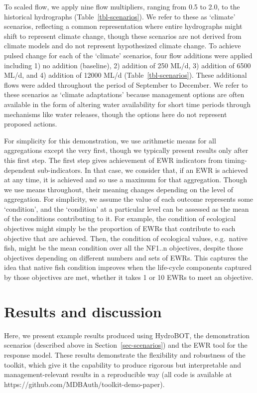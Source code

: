 \documentclass[
  number]{elsarticle}
\begin{document}
To scaled flow, we apply nine flow multipliers, ranging from 0.5 to 2.0,
to the historical hydrographs (Table~\ref{tbl-scenarios}). We refer to
these as `climate' scenarios, reflecting a common representation where
entire hydrographs might shift to represent climate change, though these
scenarios are not derived from climate models and do not represent
hypothesized climate change. To achieve pulsed change for each of the
`climate' scenarios, four flow additions were applied including 1) no
addition (baseline), 2) addition of 250 ML/d, 3) addition of 6500 ML/d,
and 4) addition of 12000 ML/d (Table~\ref{tbl-scenarios}). These
additional flows were added throughout the period of September to
December. We refer to these scenarios as `climate adaptations' because
management options are often available in the form of altering water
availability for short time periods through mechanisms like water
releases, though the options here do not represent proposed actions.

For simplicity for this demonstration, we use arithmetic means for all
aggregations except the very first, though we typically present results
only after this first step. The first step gives achievement of EWR
indicators from timing-dependent sub-indicators. In that case, we
consider that, if an EWR is achieved at any time, it is achieved and so
use a maximum for that aggregation. Though we use means throughout,
their meaning changes depending on the level of aggregation. For
simplicity, we assume the value of each outcome represents some
`condition', and the `condition' at a particular level can be assessed
as the mean of the conditions contributing to it. For example, the
condition of ecological objectives might simply be the proportion of
EWRs that contribute to each objective that are achieved. Then, the
condition of ecological values, e.g.~native fish, might be the mean
condition over all the NF1..n objectives, despite those objectives
depending on different numbers and sets of EWRs. This captures the idea
that native fish condition improves when the life-cycle components
captured by those objectives are met, whether it takes 1 or 10 EWRs to
meet an objective.

\hypertarget{results-and-discussion}{%
\section{Results and discussion}\label{results-and-discussion}}

Here, we present example results produced using HydroBOT, the
demonstration scenarios (described above in Section~\ref{sec-scenarios})
and the EWR tool for the response model. These results demonstrate the
flexibility and robustness of the toolkit, which give it the capability
to produce rigorous but interpretable and management-relevant results in
a reproducible way (all code is available at
https://github.com/MDBAuth/toolkit-demo-paper).
\end{document}
